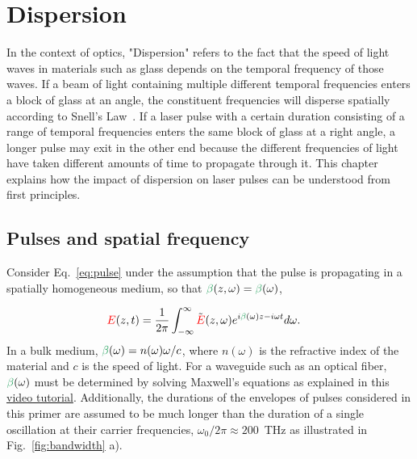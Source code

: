 \chapter{Dispersion}
\label{ch:Dispersion}
In the context of optics, "Dispersion" refers to the fact that the speed of light waves in materials such as glass depends on the temporal frequency of those waves. If a beam of light containing multiple different temporal frequencies enters a block of glass at an angle, the constituent frequencies will disperse spatially according to Snell's Law~\cite{Snell}. If a laser pulse with a certain duration consisting of a range of temporal frequencies enters the same block of glass at a right angle, a longer pulse may exit in the other end because the different frequencies of light have taken different amounts of time to propagate through it. This chapter explains how the impact of dispersion on laser pulses can be understood from first principles. 

\section{Pulses and spatial frequency}
Consider Eq.~\ref{eq:pulse} under the assumption that the pulse is propagating in a spatially homogeneous medium, so that $\betag(z,\omega)=\betag(\omega)$,

\begin{align}
\label{eq:spatially_uniform}
    \E(z,t) &= \frac{1}{2\pi}\int_{-\infty}^{\infty} \Tilde{\E}(z,\omega) e^{i\betag(\omega)z-i\omega t} d\omega.
\end{align}
In a bulk medium, $\betag(\omega)=n(\omega)\omega/c$, where $n(\omega)$ is the refractive index of the material and $c$ is the speed of light. For a waveguide such as an optical fiber, $\betag(\omega)$ must be determined by solving Maxwell's equations as explained in this \href{https://youtu.be/z7fyT3etgis}{video tutorial}. Additionally, the durations of the envelopes of pulses considered in this primer are assumed to be much longer than the duration of a single oscillation at their carrier frequencies, $\omega_0/2\pi\approx 200$~THz as illustrated in Fig.~\ref{fig:bandwidth} a). 

